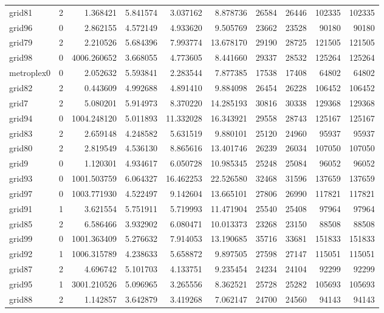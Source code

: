 \begin{longtable}{|l|r|r|r|r|r|r|r|r|r|}
grid81 & 2 & 1.368421 & 5.841574 & 3.037162 & 8.878736 & 26584 & 26446 & 102335 & 102335 \\
grid96 & 0 & 2.862155 & 4.572149 & 4.933620 & 9.505769 & 23662 & 23528 & 90180 & 90180 \\
grid79 & 2 & 2.210526 & 5.684396 & 7.993774 & 13.678170 & 29190 & 28725 & 121505 & 121505 \\
grid98 & 0 & 4006.260652 & 3.668055 & 4.773605 & 8.441660 & 29337 & 28532 & 125264 & 125264 \\
metroplex0 & 0 & 2.052632 & 5.593841 & 2.283544 & 7.877385 & 17538 & 17408 & 64802 & 64802 \\
grid82 & 2 & 0.443609 & 4.992688 & 4.891410 & 9.884098 & 26454 & 26228 & 106452 & 106452 \\
grid7 & 2 & 5.080201 & 5.914973 & 8.370220 & 14.285193 & 30816 & 30338 & 129368 & 129368 \\
grid94 & 0 & 1004.248120 & 5.011893 & 11.332028 & 16.343921 & 29558 & 28743 & 125167 & 125167 \\
grid83 & 2 & 2.659148 & 4.248582 & 5.631519 & 9.880101 & 25120 & 24960 & 95937 & 95937 \\
grid80 & 2 & 2.819549 & 4.536130 & 8.865616 & 13.401746 & 26239 & 26034 & 107050 & 107050 \\
grid9 & 0 & 1.120301 & 4.934617 & 6.050728 & 10.985345 & 25248 & 25084 & 96052 & 96052 \\
grid93 & 0 & 1001.503759 & 6.064327 & 16.462253 & 22.526580 & 32468 & 31596 & 137659 & 137659 \\
grid97 & 0 & 1003.771930 & 4.522497 & 9.142604 & 13.665101 & 27806 & 26990 & 117821 & 117821 \\
grid91 & 1 & 3.621554 & 5.751911 & 5.719993 & 11.471904 & 25540 & 25408 & 97964 & 97964 \\
grid85 & 2 & 6.586466 & 3.932902 & 6.080471 & 10.013373 & 23268 & 23150 & 88508 & 88508 \\
grid99 & 0 & 1001.363409 & 5.276632 & 7.914053 & 13.190685 & 35716 & 33681 & 151833 & 151833 \\
grid92 & 1 & 1006.315789 & 4.238633 & 5.658872 & 9.897505 & 27598 & 27147 & 115051 & 115051 \\
grid87 & 2 & 4.696742 & 5.101703 & 4.133751 & 9.235454 & 24234 & 24104 & 92299 & 92299 \\
grid95 & 1 & 3001.210526 & 5.096965 & 3.265556 & 8.362521 & 25728 & 25282 & 105693 & 105693 \\
grid88 & 2 & 1.142857 & 3.642879 & 3.419268 & 7.062147 & 24700 & 24560 & 94143 & 94143 \\

\end{longtable}
